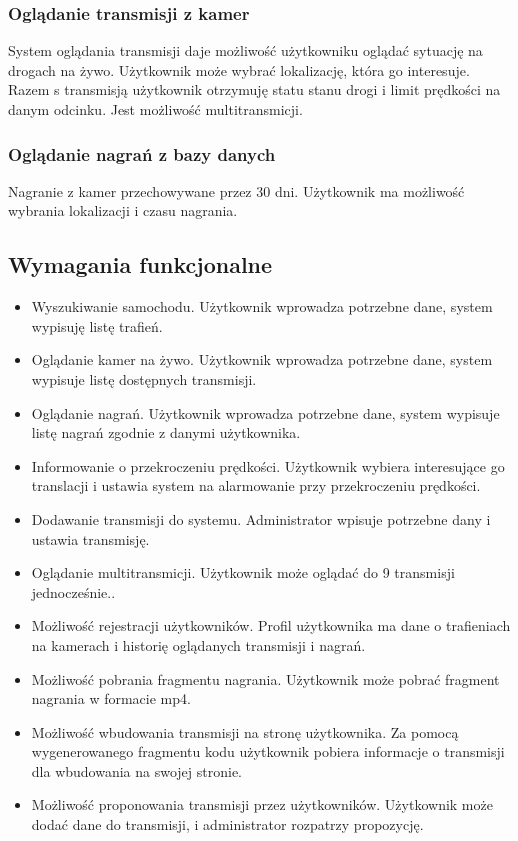 \documentclass[12pt]{article}
\begin{document}
\subsubsection*{Oglądanie transmisji z kamer}
System oglądania transmisji daje możliwość użytkowniku oglądać sytuację na drogach na żywo. Użytkownik może wybrać lokalizację, która go interesuje. Razem s transmisją użytkownik otrzymuję statu stanu drogi i limit prędkości na danym odcinku.  Jest możliwość multitransmicji. 
\subsubsection*{Oglądanie nagrań z bazy danych}
Nagranie z kamer przechowywane przez 30 dni. Użytkownik ma możliwość wybrania lokalizacji i czasu nagrania.
\subsection{Wymagania funkcjonalne}
\begin{itemize}
\item Wyszukiwanie samochodu. Użytkownik wprowadza potrzebne dane, system wypisuję listę trafień.
\item Oglądanie kamer na żywo. Użytkownik wprowadza potrzebne dane, system wypisuje listę dostępnych transmisji.
\item Oglądanie nagrań. Użytkownik wprowadza potrzebne dane, system wypisuje listę nagrań zgodnie z danymi użytkownika.
\item Informowanie o przekroczeniu prędkości. Użytkownik wybiera interesujące go translacji i ustawia system na alarmowanie przy przekroczeniu prędkości.
\item Dodawanie transmisji do systemu. Administrator wpisuje potrzebne dany i ustawia transmisję.
\item Oglądanie multitransmicji. Użytkownik może oglądać do 9 transmisji jednocześnie..
\item Możliwość rejestracji użytkowników. Profil użytkownika ma dane o trafieniach na kamerach i historię oglądanych transmisji i nagrań. 
\item Możliwość pobrania fragmentu nagrania. Użytkownik może pobrać fragment nagrania w formacie mp4.
\item Możliwość wbudowania transmisji na stronę użytkownika. Za pomocą wygenerowanego fragmentu kodu użytkownik pobiera informacje o transmisji dla wbudowania na swojej stronie.
\item Możliwość proponowania transmisji przez użytkowników. Użytkownik może dodać dane do transmisji, i administrator rozpatrzy propozycję.
\end{itemize}
\end{document}
